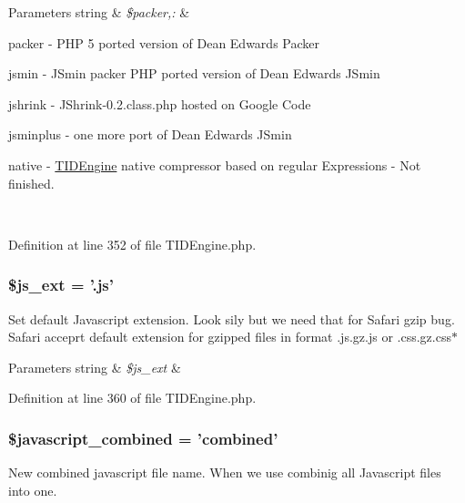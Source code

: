 \begin{DoxyParams}[1]{Parameters}
string & {\em \$packer,:} & 
\begin{DoxyItemize}
\item packer -\/ PHP 5 ported version of Dean Edwards Packer
\item jsmin -\/ JSmin packer PHP ported version of Dean Edwards JSmin
\item jshrink -\/ JShrink-\/0.2.class.php hosted on Google Code
\item jsminplus -\/ one more port of Dean Edwards JSmin
\item native -\/ \hyperlink{class_t_i_d_engine}{TIDEngine} native compressor based on regular Expressions -\/ Not finished. 
\end{DoxyItemize}\\
\hline
\end{DoxyParams}


Definition at line 352 of file TIDEngine.php.

\hypertarget{group__js__cache__settings_ga0d34488b74d51638331cf68641b18369}{
\subsubsection[{\$js\_\-ext}]{\setlength{\rightskip}{0pt plus 5cm}\$js\_\-ext = '.js'}}
\label{group__js__cache__settings_ga0d34488b74d51638331cf68641b18369}
Set default Javascript extension. Look sily but we need that for Safari gzip bug. Safari acceprt default extension for gzipped files in format .js.gz.js or .css.gz.css$\ast$


\begin{DoxyParams}[1]{Parameters}
string & {\em \$js\_\-ext} & \\
\hline
\end{DoxyParams}


Definition at line 360 of file TIDEngine.php.

\hypertarget{group__js__cache__settings_ga08f8005b517d19f5a2d099d7ec595e2d}{
\subsubsection[{\$javascript\_\-combined}]{\setlength{\rightskip}{0pt plus 5cm}\$javascript\_\-combined = 'combined'}}
\label{group__js__cache__settings_ga08f8005b517d19f5a2d099d7ec595e2d}
New combined javascript file name. When we use combinig all Javascript files into one.


